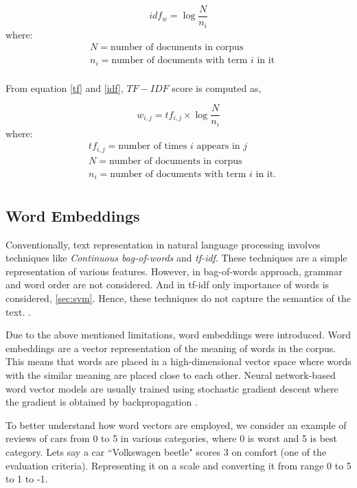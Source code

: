 \begin{equation}\label{idf}
idf_{w} = \log\frac{N}{n_{i}}
\end{equation}
where:
\begin{align*}
      & N=\text{number of documents in corpus}\\
      & n_{i}=\text{number of documents with term $i$ in it}\\
\end{align*}     

From equation \ref{tf} and \ref{idf}, $TF-IDF$ score is computed as,

\begin{equation}\label{tf-idf}
w_{i,j} = tf_{i,j} \times \log\frac{N}{n_{i}}
\end{equation}
where:
\begin{align*}
      & tf_{i,j}=\text{number of times $i$ appears in $j$}\\
      & N=\text{number of documents in corpus}\\
      & n_{i}=\text{number of documents with term $i$ in it.}\\
\end{align*}

\todots

\subsection{Word Embeddings}
Conventionally, text representation in natural language processing involves techniques like \textit{Continuous bag-of-words} and \textit{tf-idf}. These techniques are a simple representation of various features. However, in bag-of-words approach, grammar and word order are not considered. And in tf-idf only importance of words is considered, \ref{sec:svm}. Hence, these techniques do not capture the semantics of the text. \cite{maas2011learning}.

Due to the above mentioned limitations, word embeddings were introduced. Word embeddings are a vector representation of the meaning of words in the corpus. This means that words are placed in a high-dimensional vector space where words with the similar meaning are placed close to each other. Neural network-based word vector models are usually trained using stochastic gradient descent where the gradient is obtained by backpropagation \cite{le2014distributed}.

To better understand how word vectors are employed, we consider an example of reviews of cars from 0 to 5 in various categories, where 0 is worst and 5 is best category. Lets say a car ``Volkswagen beetle" scores 3 on comfort (one of the evaluation criteria). Representing it on a scale and converting it from range 0 to 5 to 1 to -1.

